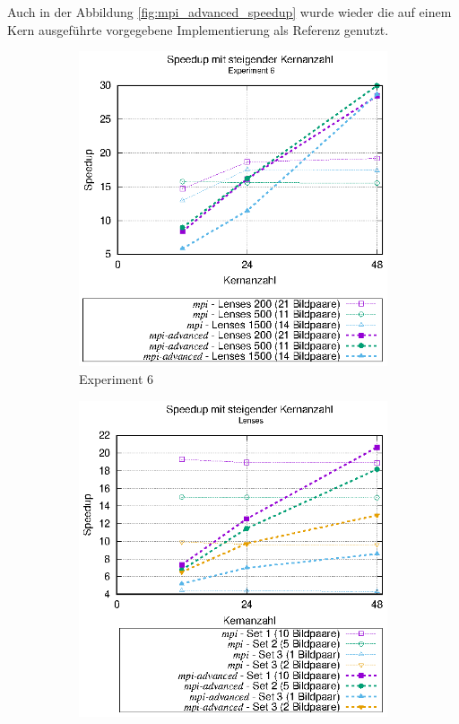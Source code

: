 Auch in der Abbildung \ref{fig:mpi_advanced_speedup} wurde wieder die auf einem Kern ausgeführte vorgegebene Implementierung als Referenz genutzt. 

\begin{center}
	\begin{figure}[h]
		\begin{subfigure}[b]{0.45\textwidth}
			\centering
			\includegraphics[width=\textwidth]{pdf/mpi_advanced_speedup_exp6}
			\caption{Experiment 6}
			\label{fig:mpi_advanced_speedup_exp6}
		\end{subfigure}
	\hfill
		\begin{subfigure}[b]{0.45\textwidth}
			\centering
			\includegraphics[width=\textwidth]{pdf/mpi_advanced_speedup_lenses}

\end{subfigure}
\end{figure}
\end{center}
